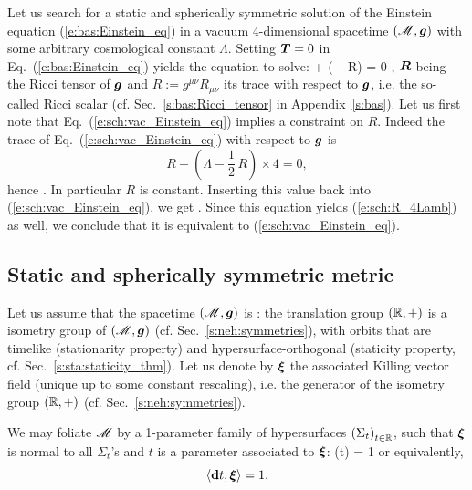 Let us search for a static and spherically symmetric solution of the
Einstein equation (\ref{e:bas:Einstein_eq}) in a vacuum
4-dimensional spacetime $(\mathscr{M},\bm{g})$ with some arbitrary cosmological constant
$\Lambda$. Setting $\bm{T}=0$ in Eq.~(\ref{e:bas:Einstein_eq}) yields
the equation to solve:
\be \label{e:sch:vac_Einstein_eq}
      + \left(\Lambda - \, R\right)  = 0 ,
\ee
$\bm{R}$ being the Ricci tensor of $\bm{g}$ and $R:=g^{\mu\nu} R_{\mu\nu}$ its
trace with respect to $\bm{g}$, i.e. the so-called Ricci scalar
(cf. Sec.~\ref{s:bas:Ricci_tensor} in Appendix~\ref{s:bas}).
Let us first note that Eq.~(\ref{e:sch:vac_Einstein_eq}) implies a
constraint on $R$. Indeed the trace of Eq.~(\ref{e:sch:vac_Einstein_eq})
with respect to $\bm{g}$ is
\[
    R + \left(\Lambda - \frac{1}{2}\, R\right) \times 4 = 0 ,
\]
hence
\be \label{e:sch:R_4Lamb}
     .
\ee
In particular $R$ is constant.
Inserting this value back into (\ref{e:sch:vac_Einstein_eq}), we get
\be \label{e:sch:vac_Einstein_eq_Lamb}
     .
\ee
Since this equation yields (\ref{e:sch:R_4Lamb}) as well, we conclude
that it is equivalent to (\ref{e:sch:vac_Einstein_eq}).

\subsection{Static and spherically symmetric metric} \label{s:sch:static_spher}

Let us assume that the spacetime $(\mathscr{M},\bm{g})$ is :
the translation group $(\mathbb{R},+)$ is a isometry group of $(\mathscr{M},\bm{g})$
(cf. Sec.~\ref{s:neh:symmetries}), with orbits that are timelike
(stationarity property) and hypersurface-orthogonal (staticity property, cf. Sec.~\ref{s:sta:staticity_thm}). Let us denote by $\bm{\xi}$ the associated Killing vector
field (unique up to some constant rescaling), i.e. the generator of the
isometry group $(\mathbb{R},+)$ (cf. Sec.~\ref{s:neh:symmetries}).

We may foliate $\mathscr{M}$ by a 1-parameter family of hypersurfaces
$\left(\Sigma_t\right)_{t\in\mathbb{R}}$, such that $\bm{\xi}$ is normal to
all $\Sigma_t$'s and $t$ is a parameter associated to $\bm{\xi}$:
\be \label{e:sch:xi_t}
    \w{\xi}(t) = 1
\ee
or equivalently,
\[
    \langle \mathbf{d} t , \bm{\xi} \rangle = 1.
\]

